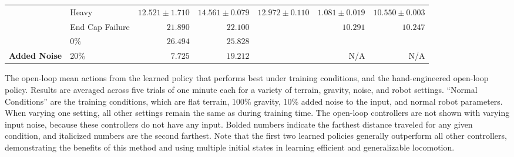 \begin{table}[t]
\begin{center}
{\begin{tabular}{|llrrrrr|}
            \rowcolor[HTML]{D3D3D3}
            \cellcolor[HTML]{D3D3D3}                                   & Heavy           & \multicolumn{1}{r|}{\cellcolor[HTML]{D3D3D3}$12.521\pm1.710$}          & \multicolumn{1}{r|}{\cellcolor[HTML]{D3D3D3}$\mathbf{14.561\pm0.079}$} & \multicolumn{1}{r|}{\cellcolor[HTML]{D3D3D3}$\mathit{12.972\pm0.110}$} & \multicolumn{1}{r|}{\cellcolor[HTML]{D3D3D3}$1.081\pm0.019$}     & $10.550\pm0.003$ \\
            \rowcolor[HTML]{D3D3D3}
            \multirow{-2}{*}{\cellcolor[HTML]{D3D3D3}\textbf{Robot}}   & End Cap Failure & \multicolumn{1}{r|}{\cellcolor[HTML]{D3D3D3}$\mathit{21.890}$}         & \multicolumn{1}{r|}{\cellcolor[HTML]{D3D3D3}$\mathbf{22.100}$}         & \multicolumn{1}{r|}{\cellcolor[HTML]{D3D3D3}$ $}                       & \multicolumn{1}{r|}{\cellcolor[HTML]{D3D3D3}$10.291$}            & $10.247$ \\
                                                                       & 0\%             & \multicolumn{1}{r|}{$\mathbf{26.494}$}                                 & \multicolumn{1}{r|}{$\mathit{25.828}$}                                 & \multicolumn{1}{r|}{$ $}                                               & \multicolumn{1}{r|}{}                                            & \\
            \multirow{-2}{*}{\textbf{Added Noise}}                     & 20\%            & \multicolumn{1}{r|}{$\mathit{7.725}$}                                  & \multicolumn{1}{r|}{$\mathbf{19.212}$}                                 & \multicolumn{1}{r|}{$ $}                                               & \multicolumn{1}{r|}{\multirow{-2}{*}{N/A}}                       & \multirow{-2}{*}{N/A} \\
            \hline
        \end{tabular}%
    }
    \label{table:distance}
    \end{center}
    \vspace{-0.1in}
    \fontsize{10pt}{12pt}\selectfont
The open-loop mean actions from the learned policy that performs best under training conditions, and the hand-engineered open-loop policy. 
Results are averaged across five trials of one minute each for a variety of terrain, gravity, noise, and robot settings.
``Normal Conditions'' are the training conditions, which are flat terrain, 100\% gravity, 10\% added noise to the input, and normal robot parameters. 
When varying one setting, all other settings remain the same as during training time. 
The open-loop controllers are not shown with varying input noise, because these controllers do not have any input.
Bolded numbers indicate the farthest distance traveled for any given condition, and italicized numbers are the second farthest. 
Note that the first two learned policies generally outperform all other controllers, demonstrating the benefits of this method and using multiple initial states in learning efficient and generalizable locomotion.
\end{table}

